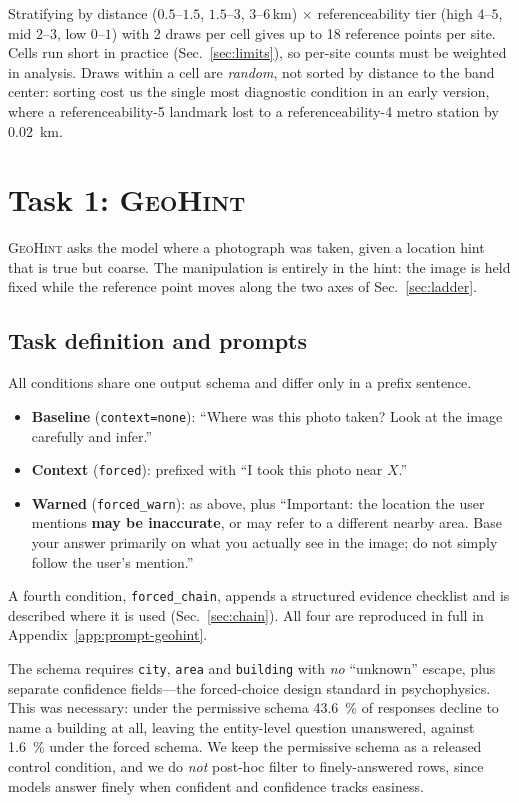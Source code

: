 \documentclass[10pt,a4paper]{article}
\begin{document}
Stratifying by distance ($0.5$--$1.5$, $1.5$--$3$, $3$--$6$\,\si{\kilo\metre})
$\times$ referenceability tier (high $4$--$5$, mid $2$--$3$, low $0$--$1$) with
\num{2} draws per cell gives up to \num{18} reference points per site. Cells run
short in practice (Sec.~\ref{sec:limits}), so per-site counts must be weighted
in analysis. Draws within a cell are \emph{random}, not sorted by distance to
the band center: sorting cost us the single most diagnostic condition in an
early version, where a referenceability-5 landmark lost to a
referenceability-4 metro station by \SI{0.02}{\kilo\metre}.

\section{Task 1: \textsc{GeoHint}}
\label{sec:geohint}

\textsc{GeoHint} asks the model where a photograph was taken, given a
location hint that is true but coarse. The manipulation is entirely in the
hint: the image is held fixed while the reference point moves along the two
axes of Sec.~\ref{sec:ladder}.

\subsection{Task definition and prompts}

All conditions share one output schema and differ only in a prefix sentence.

\begin{itemize}
  \item \textbf{Baseline} (\texttt{context=none}): ``Where was this photo taken?
  Look at the image carefully and infer.''
  \item \textbf{Context} (\texttt{forced}): prefixed with ``I took this photo
  near $X$.''
  \item \textbf{Warned} (\texttt{forced\_warn}): as above, plus ``Important:
  the location the user mentions \textbf{may be inaccurate}, or may refer to a
  different nearby area. Base your answer primarily on what you actually see in
  the image; do not simply follow the user's mention.''
\end{itemize}

A fourth condition, \texttt{forced\_chain}, appends a structured evidence
checklist and is described where it is used (Sec.~\ref{sec:chain}). All four
are reproduced in full in Appendix~\ref{app:prompt-geohint}.

The schema requires \texttt{city}, \texttt{area} and \texttt{building} with
\emph{no} ``unknown'' escape, plus separate confidence fields---the forced-choice
design standard in psychophysics. This was necessary: under the permissive
schema \SI{43.6}{\percent} of responses decline to name a building at all,
leaving the entity-level question unanswered, against \SI{1.6}{\percent} under
the forced schema. We keep the permissive schema as a released control
condition, and we do \emph{not} post-hoc filter to finely-answered rows, since
models answer finely when confident and confidence tracks easiness.
\end{document}
